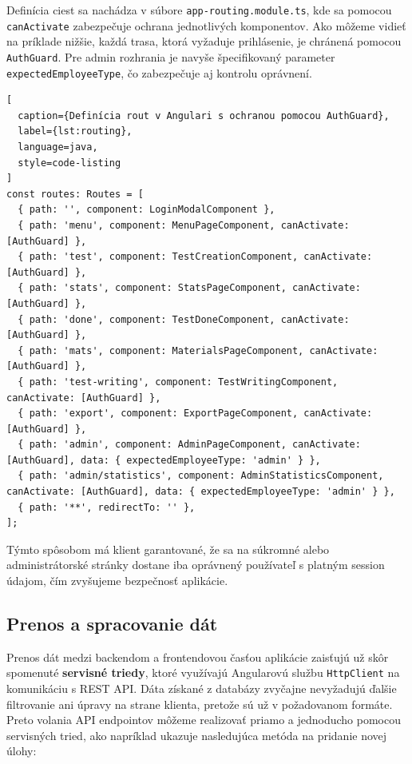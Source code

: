Definícia ciest sa nachádza v súbore \texttt{app-routing.module.ts}, kde sa pomocou \texttt{canActivate} zabezpečuje ochrana jednotlivých komponentov. Ako môžeme vidieť na príklade nižšie, každá trasa, ktorá vyžaduje prihlásenie, je chránená pomocou \texttt{AuthGuard}. Pre admin rozhrania je navyše špecifikovaný parameter \texttt{expectedEmployeeType}, čo zabezpečuje aj kontrolu oprávnení.

\begin{lstlisting}[
  caption={Definícia rout v Angulari s ochranou pomocou AuthGuard},
  label={lst:routing},
  language=java,
  style=code-listing
]
const routes: Routes = [
  { path: '', component: LoginModalComponent },
  { path: 'menu', component: MenuPageComponent, canActivate: [AuthGuard] },
  { path: 'test', component: TestCreationComponent, canActivate: [AuthGuard] },
  { path: 'stats', component: StatsPageComponent, canActivate: [AuthGuard] },
  { path: 'done', component: TestDoneComponent, canActivate: [AuthGuard] },
  { path: 'mats', component: MaterialsPageComponent, canActivate: [AuthGuard] },
  { path: 'test-writing', component: TestWritingComponent, canActivate: [AuthGuard] },
  { path: 'export', component: ExportPageComponent, canActivate: [AuthGuard] },
  { path: 'admin', component: AdminPageComponent, canActivate: [AuthGuard], data: { expectedEmployeeType: 'admin' } },
  { path: 'admin/statistics', component: AdminStatisticsComponent, canActivate: [AuthGuard], data: { expectedEmployeeType: 'admin' } },
  { path: '**', redirectTo: '' },
];
\end{lstlisting}

Týmto spôsobom má klient garantované, že sa na súkromné alebo administrátorské stránky dostane iba oprávnený používateľ s platným session údajom, čím zvyšujeme bezpečnosť aplikácie.

 
 

\subsection{Prenos a spracovanie dát}

Prenos dát medzi backendom a frontendovou časťou aplikácie zaisťujú už skôr spomenuté \textbf{servisné triedy}, ktoré využívajú Angularovú službu \texttt{HttpClient} na komunikáciu s REST API.
 Dáta získané z databázy zvyčajne nevyžadujú ďalšie filtrovanie ani úpravy na strane klienta, pretože sú už v požadovanom formáte.
  Preto volania API endpointov môžeme realizovať priamo a jednoducho pomocou servisných tried, ako napríklad ukazuje nasledujúca metóda na pridanie novej úlohy:

